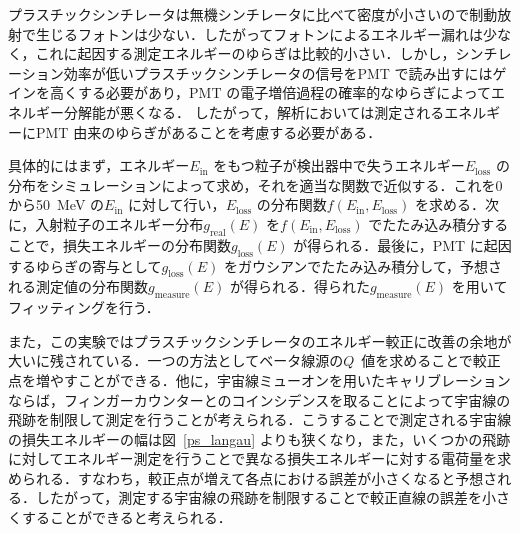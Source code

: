 プラスチックシンチレータは無機シンチレータに比べて密度が小さいので制動放射で生じるフォトンは少ない．したがってフォトンによるエネルギー漏れは少なく，これに起因する測定エネルギーのゆらぎは比較的小さい．しかし，シンチレーション効率が低いプラスチックシンチレータの信号をPMT で読み出すにはゲインを高くする必要があり，PMT の電子増倍過程の確率的なゆらぎによってエネルギー分解能が悪くなる．
したがって，解析においては測定されるエネルギーにPMT 由来のゆらぎがあることを考慮する必要がある．

具体的にはまず，エネルギー$E_\mathrm{in}$ をもつ粒子が検出器中で失うエネルギー$E_\mathrm{loss}$ の分布をシミュレーションによって求め，それを適当な関数で近似する．これを0から50~MeV の$E_\mathrm{in}$ に対して行い，$E_\mathrm{loss}$ の分布関数$f(E_\mathrm{in}, E_\mathrm{loss})$ を求める．次に，入射粒子のエネルギー分布$g_{\mathrm{real}}(E)$ を$f(E_\mathrm{in}, E_\mathrm{loss})$ でたたみ込み積分することで，損失エネルギーの分布関数$g_{\mathrm{loss}}(E)$ が得られる．最後に，PMT に起因するゆらぎの寄与として$g_{\mathrm{loss}}(E)$ をガウシアンでたたみ込み積分して，予想される測定値の分布関数$g_{\mathrm{measure}}(E)$ が得られる．得られた$g_{\mathrm{measure}}(E)$ を用いてフィッティングを行う．
  
また，この実験ではプラスチックシンチレータのエネルギー較正に改善の余地が大いに残されている．一つの方法としてベータ線源の$Q$~値を求めることで較正点を増やすことができる．他に，宇宙線ミューオンを用いたキャリブレーションならば，フィンガーカウンターとのコインシデンスを取ることによって宇宙線の飛跡を制限して測定を行うことが考えられる．こうすることで測定される宇宙線の損失エネルギーの幅は図~\ref{ps_langau} よりも狭くなり，また，いくつかの飛跡に対してエネルギー測定を行うことで異なる損失エネルギーに対する電荷量を求められる．すなわち，較正点が増えて各点における誤差が小さくなると予想される．したがって，測定する宇宙線の飛跡を制限することで較正直線の誤差を小さくすることができると考えられる．

